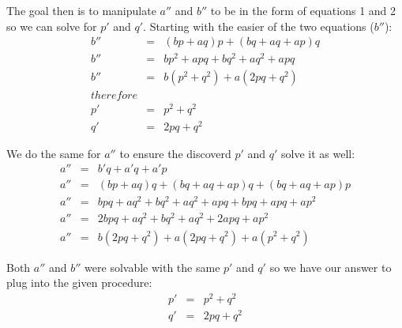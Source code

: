 \documentclass[a4paper,12pt]{article}
\begin{document}
The goal then is to manipulate $a''$ and $b''$ to be in the form of equations 1 and 2 so we can solve for $p'$ and $q'$.  Starting with the easier of the two equations ($b''$):
\begin{eqnarray*}
b'' & = & (bp + aq)p + (bq + aq + ap)q \\
b'' & = & bp^2 + apq + bq^2 + aq^2 + apq \\
b'' & = & b(p^2 + q^2) + a(2pq + q^2) \\
{therefore} \\
p'  & = & p^2 + q^2 \\
q'  & = & 2pq + q^2
\end{eqnarray*}

We do the same for $a''$ to ensure the discoverd $p'$ and $q'$ solve it as well:
\begin{eqnarray*}
a'' & = & b'q + a'q + a'p \\
a'' & = & (bp + aq)q + (bq + aq + ap)q + (bq + aq + ap)p \\
a'' & = & bpq + aq^2 + bq^2 + aq^2 + apq + bpq + apq + ap^2 \\
a'' & = & 2bpq + aq^2 + bq^2 + aq^2 + 2apq + ap^2 \\
a'' & = & b(2pq + q^2) + a(2pq + q^2) + a(p^2 + q^2)
\end{eqnarray*}

Both $a''$ and $b''$ were solvable with the same $p'$ and $q'$ so we have our answer to plug into the given procedure:
\begin{eqnarray*}
p'  & = & p^2 + q^2 \\
q'  & = & 2pq + q^2
\end{eqnarray*}
\end{document}
